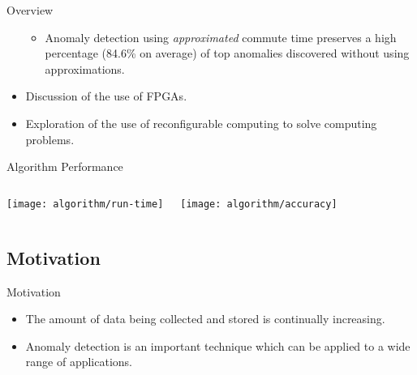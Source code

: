 \begin{frame}[label=overview]{Overview}
\begin{itemize}
\begin{itemize}
            \item Anomaly detection using \emph{approximated} commute time
                preserves a high percentage (84.6\% on average) of top anomalies
                discovered without using approximations.
            \note[item]{}
        \end{itemize}

        \item Discussion of the use of \glspl{FPGA}.

        \item Exploration of the use of reconfigurable computing to solve
            computing problems.
    \end{itemize}
\end{frame}

\begin{frame}[label=algorithm-performance]{Algorithm Performance}
    \begin{columns}[c]
        \texttt{[image: algorithm/run-time]}

        \texttt{[image: algorithm/accuracy]}
    \end{columns}
\end{frame}

\subsection{Motivation}
\begin{frame}[label=motivation]{Motivation}
    \begin{itemize}
        \item The amount of data being collected and stored is continually
            increasing.
        \item Anomaly detection is an important technique which can be applied
            to a wide range of applications.
    \end{itemize}
\end{frame}

